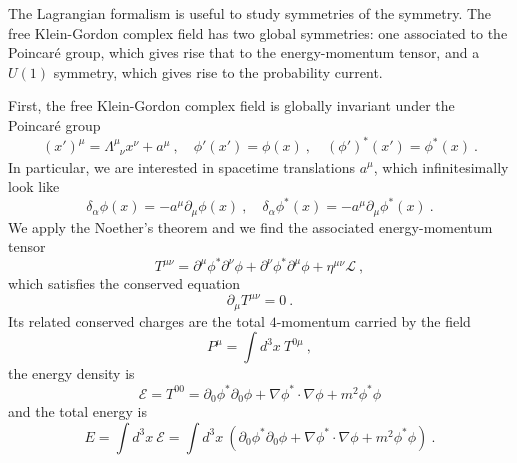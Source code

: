     The Lagrangian formalism is useful to study symmetries of the symmetry. The free Klein-Gordon complex field has two global symmetries: one associated to the Poincaré group, which gives rise that to the energy-momentum tensor, and a $U(1)$ symmetry, which gives rise to the probability current. 

    First, the free Klein-Gordon complex field is globally invariant under the Poincaré group
    \begin{equation*}
        (x')^\mu = \Lambda^\mu_{\phantom \mu \nu} x^\nu + a^\mu ~, \quad \phi'(x') = \phi(x) ~, \quad (\phi')^* (x') = \phi^*(x) ~.
    \end{equation*}
    In particular, we are interested in spacetime translations $a^\mu$, which infinitesimally look like
    \begin{equation*}
        \delta_\alpha \phi (x) = - a^\mu \partial_\mu \phi(x) ~, \quad \delta_\alpha \phi^* (x) = - a^\mu \partial_\mu \phi^*(x) ~.
    \end{equation*}
    We apply the Noether's theorem and we find the associated energy-momentum tensor
    \begin{equation*}
        T^{\mu\nu} = \partial^\mu \phi^* \partial^\nu \phi + \partial^\nu \phi^* \partial^\mu \phi + \eta^{\mu\nu} \mathcal L ~,
    \end{equation*}
    which satisfies the conserved equation 
    \begin{equation*}
        \partial_\mu T^{\mu\nu} = 0 ~.
    \end{equation*}
    Its related conserved charges are the total $4$-momentum carried by the field
    \begin{equation*}
        P^\mu = \int d^3 x ~ T^{0\mu} ~,
    \end{equation*}
    the energy density is 
    \begin{equation*}
        \mathcal E = T^{00} = \partial_0 \phi^* \partial_0 \phi + \nabla \phi^* \cdot \nabla \phi + m^2 \phi^* \phi
    \end{equation*}
    and the total energy is 
    \begin{equation*}
        E = \int d^3 x ~ \mathcal E = \int d^3 x ~ (\partial_0 \phi^* \partial_0 \phi + \nabla \phi^* \cdot \nabla \phi + m^2 \phi^* \phi) ~.
    \end{equation*}
